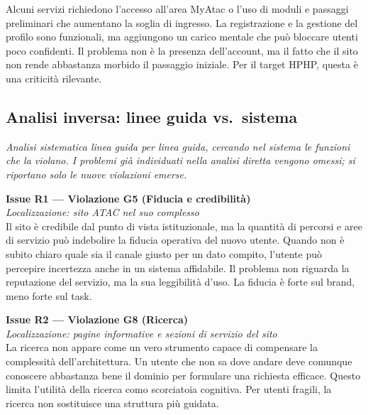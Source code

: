 \documentclass[11pt,a4paper]{article}
\begin{document}
\noindent Alcuni servizi richiedono l’accesso all’area MyAtac o l’uso di moduli e passaggi preliminari che aumentano la soglia di ingresso. La registrazione e la gestione del profilo sono funzionali, ma aggiungono un carico mentale che può bloccare utenti poco confidenti. Il problema non è la presenza dell’account, ma il fatto che il sito non rende abbastanza morbido il passaggio iniziale. Per il target HPHP, questa è una criticità rilevante.

\subsection*{Analisi inversa: linee guida vs.\ sistema}

\noindent\textit{Analisi sistematica linea guida per linea guida, cercando nel sistema le funzioni che la violano. I problemi già individuati nella analisi diretta vengono omessi; si riportano solo le nuove violazioni emerse.}

\bigskip

\noindent\textbf{Issue R1 — Violazione G5 (Fiducia e credibilità)}\label{atac:R1}\\
\textit{Localizzazione: sito ATAC nel suo complesso}\\

\noindent Il sito è credibile dal punto di vista istituzionale, ma la quantità di percorsi e aree di servizio può indebolire la fiducia operativa del nuovo utente. Quando non è subito chiaro quale sia il canale giusto per un dato compito, l’utente può percepire incertezza anche in un sistema affidabile. Il problema non riguarda la reputazione del servizio, ma la sua leggibilità d’uso. La fiducia è forte sul brand, meno forte sul task.

\bigskip

\noindent\textbf{Issue R2 — Violazione G8 (Ricerca)}\label{atac:R2}\\
\textit{Localizzazione: pagine informative e sezioni di servizio del sito}\\

\noindent La ricerca non appare come un vero strumento capace di compensare la complessità dell’architettura. Un utente che non sa dove andare deve comunque conoscere abbastanza bene il dominio per formulare una richiesta efficace. Questo limita l’utilità della ricerca como scorciatoia cognitiva. Per utenti fragili, la ricerca non sostituisce una struttura più guidata.

\bigskip
\end{document}

